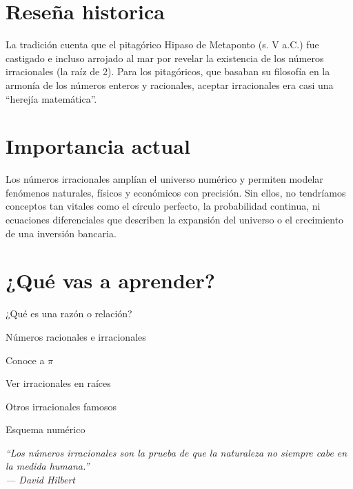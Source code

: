 

\vspace{2em} %
\section*{Reseña historica}

\begin{reseñaplana}
La tradición cuenta que el pitagórico Hipaso de Metaponto (s. V a.C.) fue castigado e incluso arrojado al 
mar por revelar la existencia de los números irracionales (la raíz de 2). Para los pitagóricos, que basaban su filosofía 
en la armonía de los números enteros y racionales, aceptar irracionales era casi una “herejía matemática”.
\end{reseñaplana}

\section*{Importancia actual}

\begin{reseñaplana}
Los números irracionales amplían el universo numérico y permiten modelar fenómenos naturales, 
físicos y económicos con precisión.  Sin ellos, no tendríamos conceptos tan vitales como el círculo perfecto, 
la probabilidad continua, ni ecuaciones diferenciales que describen la expansión del universo o el crecimiento de una inversión bancaria.
\end{reseñaplana}

\section*{¿Qué vas a aprender?}
\begin{reseñaitem}
  \item ¿Qué es una razón o relación?
  \item Números racionales e irracionales
  \item Conoce a $\pi$
  \item Ver irracionales en raíces
  \item Otros irracionales famosos
  \item Esquema numérico
\end{reseñaitem}

\vspace{1.5cm} %
\begin{flushright}
  {\fontsize{12}{14}\selectfont\itshape
  ``Los números irracionales son la prueba de que la naturaleza no siempre cabe en la medida humana.''\\[6pt]
  — David Hilbert}%
\end{flushright}


